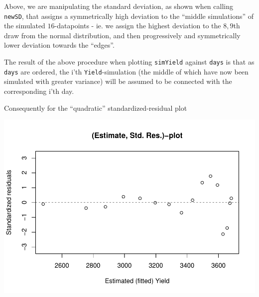 \documentclass[
]{article}
\newenvironment{Shaded}{\begin{snugshade}}{\end{snugshade}}
\newcommand{\DataTypeTok}[1]{\textcolor[rgb]{0.13,0.29,0.53}{#1}}
\newcommand{\DecValTok}[1]{\textcolor[rgb]{0.00,0.00,0.81}{#1}}
\newcommand{\FloatTok}[1]{\textcolor[rgb]{0.00,0.00,0.81}{#1}}
\newcommand{\KeywordTok}[1]{\textcolor[rgb]{0.13,0.29,0.53}{\textbf{#1}}}
\newcommand{\NormalTok}[1]{#1}
\newcommand{\OperatorTok}[1]{\textcolor[rgb]{0.81,0.36,0.00}{\textbf{#1}}}
\newcommand{\StringTok}[1]{\textcolor[rgb]{0.31,0.60,0.02}{#1}}
\begin{document}
Above, we are manipulating the standard deviation, as shown when calling
\texttt{newSD}, that assigns a symmetrically high deviation to the
``middle simulations'' of the simulated \(16\)-datapoints - ie. we
assign the highest deviation to the \(8,9\)th draw from the normal
distribution, and then progressively and symmetrically lower deviation
towards the ``edges''.

The result of the above procedure when plotting \texttt{simYield}
against \texttt{days} is that as \texttt{days} are ordered, the i'th
\texttt{Yield}-simulation (the middle of which have now been simulated
with greater variance) will be assumed to be connected with the
corresponding i'th day.

Consequently for the ``quadratic'' standardized-residual plot

\begin{Shaded}
\end{Shaded}

\begin{center}\includegraphics{matstatproblems20-21_files/figure-latex/unnamed-chunk-65-1} \end{center}
\end{document}
